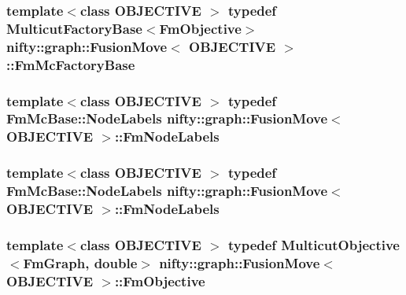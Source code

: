 \subsubsection[{Fm\+Mc\+Factory\+Base}]{\setlength{\rightskip}{0pt plus 5cm}template$<$class O\+B\+J\+E\+C\+T\+I\+V\+E $>$ typedef {\bf Multicut\+Factory\+Base}$<${\bf Fm\+Objective}$>$ {\bf nifty\+::graph\+::\+Fusion\+Move}$<$ O\+B\+J\+E\+C\+T\+I\+V\+E $>$\+::{\bf Fm\+Mc\+Factory\+Base}}\label{classnifty_1_1graph_1_1FusionMove_a75c5190f6b01321efa3f23cb10b2dd36}
\hypertarget{classnifty_1_1graph_1_1FusionMove_a411fd2cd3e59b587e5399318882ee4be}{}
\subsubsection[{Fm\+Node\+Labels}]{\setlength{\rightskip}{0pt plus 5cm}template$<$class O\+B\+J\+E\+C\+T\+I\+V\+E $>$ typedef {\bf Fm\+Mc\+Base\+::\+Node\+Labels} {\bf nifty\+::graph\+::\+Fusion\+Move}$<$ O\+B\+J\+E\+C\+T\+I\+V\+E $>$\+::{\bf Fm\+Node\+Labels}}\label{classnifty_1_1graph_1_1FusionMove_a411fd2cd3e59b587e5399318882ee4be}
\hypertarget{classnifty_1_1graph_1_1FusionMove_a411fd2cd3e59b587e5399318882ee4be}{}
\subsubsection[{Fm\+Node\+Labels}]{\setlength{\rightskip}{0pt plus 5cm}template$<$class O\+B\+J\+E\+C\+T\+I\+V\+E $>$ typedef {\bf Fm\+Mc\+Base\+::\+Node\+Labels} {\bf nifty\+::graph\+::\+Fusion\+Move}$<$ O\+B\+J\+E\+C\+T\+I\+V\+E $>$\+::{\bf Fm\+Node\+Labels}}\label{classnifty_1_1graph_1_1FusionMove_a411fd2cd3e59b587e5399318882ee4be}
\hypertarget{classnifty_1_1graph_1_1FusionMove_ad40d83951f141ac8b6fc949995916377}{}
\subsubsection[{Fm\+Objective}]{\setlength{\rightskip}{0pt plus 5cm}template$<$class O\+B\+J\+E\+C\+T\+I\+V\+E $>$ typedef {\bf Multicut\+Objective}$<${\bf Fm\+Graph}, double$>$ {\bf nifty\+::graph\+::\+Fusion\+Move}$<$ O\+B\+J\+E\+C\+T\+I\+V\+E $>$\+::{\bf Fm\+Objective}}\label{classnifty_1_1graph_1_1FusionMove_ad40d83951f141ac8b6fc949995916377}
\hypertarget{classnifty_1_1graph_1_1FusionMove_ad40d83951f141ac8b6fc949995916377}{}
